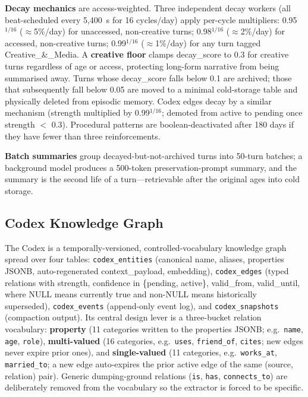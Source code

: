 \documentclass[10pt]{article}
\begin{document}
\textbf{Decay mechanics} are access-weighted. Three independent decay workers (all beat-scheduled every 5{,}400~s for 16 cycles/day) apply per-cycle multipliers: 0.95$^{1/16}$ ($\approx$5\%/day) for unaccessed, non-creative turns; 0.98$^{1/16}$ ($\approx$2\%/day) for accessed, non-creative turns; 0.99$^{1/16}$ ($\approx$1\%/day) for any turn tagged Creative\_\&\_Media. A \textbf{creative floor} clamps decay\_score to 0.3 for creative turns regardless of age or access, protecting long-form narrative from being summarised away. Turns whose decay\_score falls below 0.1 are archived; those that subsequently fall below 0.05 are moved to a minimal cold-storage table and physically deleted from episodic memory. Codex edges decay by a similar mechanism (strength multiplied by 0.99$^{1/16}$; demoted from active to pending once strength $<$ 0.3). Procedural patterns are boolean-deactivated after 180 days if they have fewer than three reinforcements.

\textbf{Batch summaries} group decayed-but-not-archived turns into 50-turn batches; a background model produces a 500-token preservation-prompt summary, and the summary is the second life of a turn---retrievable after the original ages into cold storage.

\subsection{Codex Knowledge Graph}

The Codex is a temporally-versioned, controlled-vocabulary knowledge graph spread over four tables: \texttt{codex\_entities} (canonical name, aliases, properties JSONB, auto-regenerated context\_payload, embedding), \texttt{codex\_edges} (typed relations with strength, confidence in \{pending, active\}, valid\_from, valid\_until, where NULL means currently true and non-NULL means historically superseded), \texttt{codex\_events} (append-only event log), and \texttt{codex\_snapshots} (compaction output). Its central design lever is a three-bucket relation vocabulary: \textbf{property} (11 categories written to the properties JSONB; e.g.\ \texttt{name}, \texttt{age}, \texttt{role}), \textbf{multi-valued} (16 categories, e.g.\ \texttt{uses}, \texttt{friend\_of}, \texttt{cites}; new edges never expire prior ones), and \textbf{single-valued} (11 categories, e.g.\ \texttt{works\_at}, \texttt{married\_to}; a new edge auto-expires the prior active edge of the same (source, relation) pair). Generic dumping-ground relations (\texttt{is}, \texttt{has}, \texttt{connects\_to}) are deliberately removed from the vocabulary so the extractor is forced to be specific.
\end{document}
